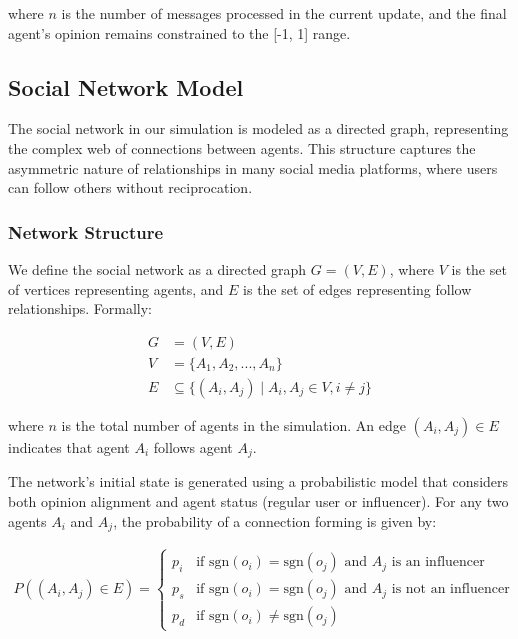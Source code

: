 where $n$ is the number of messages processed in the current update, and the final agent's opinion remains constrained to the [-1, 1] range.

\subsection{Social Network Model}
\label{subsec:social-network-model}

The social network in our simulation is modeled as a directed graph, representing the complex web of connections between agents. This structure captures the asymmetric nature of relationships in many social media platforms, where users can follow others without reciprocation.

\subsubsection{Network Structure}

We define the social network as a directed graph $G = (V, E)$, where $V$ is the set of vertices representing agents, and $E$ is the set of edges representing follow relationships. Formally:

\begin{align}
    G &= (V, E) \\
    V &= \{A_1, A_2, ..., A_n\} \\
    E &\subseteq \{(A_i, A_j) \mid A_i, A_j \in V, i \neq j\}
\end{align}

where $n$ is the total number of agents in the simulation. An edge $(A_i, A_j) \in E$ indicates that agent $A_i$ follows agent $A_j$.

The network's initial state is generated using a probabilistic model that considers both opinion alignment and agent status (regular user or influencer). For any two agents $A_i$ and $A_j$, the probability of a connection forming is given by:

\begin{align}
P((A_i, A_j) \in E) = \begin{cases}
p_i & \text{if } \text{sgn}(o_i) = \text{sgn}(o_j) \text{ and } A_j \text{ is an influencer} \\
p_s & \text{if } \text{sgn}(o_i) = \text{sgn}(o_j) \text{ and } A_j \text{ is not an influencer} \\
p_d & \text{if } \text{sgn}(o_i) \neq \text{sgn}(o_j)
\end{cases}
\end{align}

